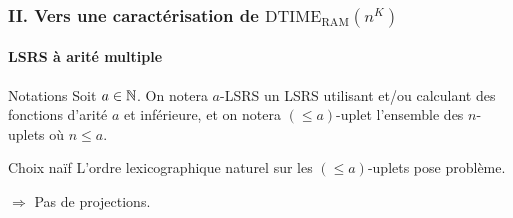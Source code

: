\documentclass[10pt]{beamer}
\newcommand{\dtimeram}{\text{DTIME}_{\text{RAM}}\left( n^K \right)}
\newcommand{\leqa}{\left( \leqslant a \right)}
\begin{document}
	
	\begin{frame}
		\frametitle{II. Vers une caractérisation de $\dtimeram$}
		\framesubtitle{LSRS à arité multiple}

		\begin{block}{Notations}
			Soit $a \in \mathbb{N}$. On notera $a$-LSRS un LSRS utilisant et/ou calculant des fonctions d'arité $a$ et inférieure, et on notera $\leqa$-uplet l'ensemble des $n$-uplets où $n \leqslant a$.
		\end{block}
		
		\pause 
		
		\begin{block}{Choix naïf}
			L'ordre lexicographique naturel sur les $\leqa$-uplets pose problème.
			
			$\Rightarrow$ Pas de projections.
		\end{block}
	\end{frame}
	
\end{document}
